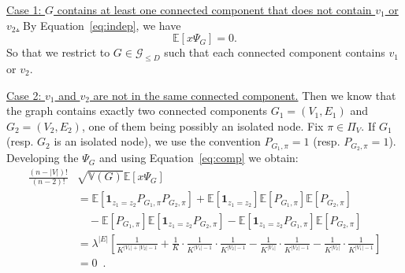 \documentclass[final]{colt2026}
\newcommand{\1}{\mathbf{1}}
\begin{document}
\noindent
\underline{Case 1: $G$ contains at least one connected component that does not contain $v_1$ or $v_2$.} By Equation~\eqref{eq:indep}, we have 
$$\mathbb E[x\Psi_G] = 0.$$
So that we restrict to $G\in \mathcal G_{\leq D}$ such that each connected component contains $v_1$ or $v_2$.

\noindent
\underline{Case 2: $v_1$ and $v_2$ are not in the same connected component.} Then we know that the graph contains exactly two connected components $G_1=(V_1,E_1)$ and $G_2=(V_2,E_2)$, one of them being possibly an isolated node.  Fix $\pi\in \Pi_V$. If $G_1$ (resp. $G_2$ is an isolated node), we use the convention $P_{G_1,\pi}=1$ (resp. $P_{G_2,\pi}=1$). Developing the $\Psi_G$ and  using Equation~\eqref{eq:comp} we obtain:
\begin{align*}
\frac{(n-|V|)!}{(n-2)!}&\sqrt{\mathbb V(G)}\mathbb E[x\Psi_G] \\
&=  \mathbb E[\1_{z_1=z_2}P_{G_1,\pi}P_{G_2,\pi}] +  \mathbb E[\1_{z_1=z_2}] \mathbb E[P_{G_1,\pi}]\mathbb E[P_{G_2,\pi}]\\ &\quad  -    \mathbb E[P_{G_1,\pi}]\mathbb E[\1_{z_1=z_2}P_{G_2,\pi}]-\mathbb E[\1_{z_1=z_2}P_{G_1,\pi}]\mathbb E[P_{G_2,\pi}] \\& = \lambda^{|E|} \left[\frac{1}{K^{|V_1|+|V_2|-1}}+\frac{1}{K}\cdot \frac{1}{K^{|V_1|-1}}\cdot \frac{1}{K^{|V_2|-1}} - \frac{1}{K^{|V_1|}}\cdot\frac{1}{K^{|V_2|-1}}- \frac{1}{K^{|V_2|}}\cdot\frac{1}{K^{|V_1|-1}} \right]\\
& = 0\enspace .
\end{align*}
\end{document}
